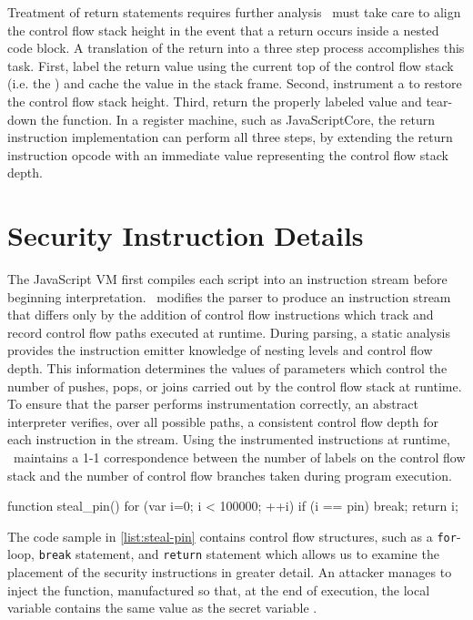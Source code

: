 Treatment of return statements requires further analysis
\FlowCore\ must take care to align the control flow stack height in the event that a return occurs inside a nested code block.
A translation of the return into a three step process accomplishes this task.
First, label the return value using the current top of the control flow stack (i.e. the \pclabel) and cache the value in the stack frame.
Second, instrument a \popj to restore the control flow stack height.
Third, return the properly labeled value and tear-down the function.
In a register machine, such as JavaScriptCore, the return instruction implementation can perform all three steps, by extending the return instruction opcode with an immediate value representing the control flow stack depth.

\section{Security Instruction Details}

The JavaScript VM first compiles each script into an instruction stream before beginning interpretation.
\FlowCore\ modifies the parser to produce an instruction stream that differs only by the addition of control flow instructions which track and record control flow paths executed at runtime.
During parsing, a static analysis provides the instruction emitter knowledge of nesting levels and control flow depth.
This information determines the values of parameters which control the number of pushes, pops, or joins carried out by the control flow stack at runtime.
To ensure that the parser performs instrumentation correctly, an abstract interpreter verifies, over all possible paths, a consistent control flow depth for each instruction in the stream.
Using the instrumented instructions at runtime, \FlowCore\ maintains a 1-1 correspondence between the number of labels on the control flow stack and the number of control flow branches taken during program execution.

\begin{jscode}
function steal_pin() {
  for (var i=0; i < 100000; ++i) {
    if (i == pin) break;
  }
  return i;
}
\end{jscode}

The code sample in \autoref{list:steal-pin} contains control flow structures, such as a \texttt{for}-loop, \texttt{break} statement, and \texttt{return} statement which allows us to examine the placement of the security instructions in greater detail.
An attacker manages to inject the  function, manufactured so that, at the end of execution, the local variable  contains the same value as the secret variable .

